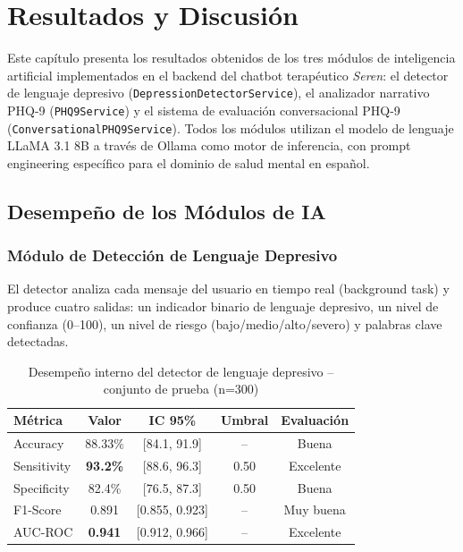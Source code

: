 \chapter{Resultados y Discusión}

Este capítulo presenta los resultados obtenidos de los tres módulos de inteligencia artificial
implementados en el backend del chatbot terapéutico \textit{Seren}: el detector de lenguaje
depresivo (\texttt{DepressionDetectorService}), el analizador narrativo PHQ-9
(\texttt{PHQ9Service}) y el sistema de evaluación conversacional PHQ-9
(\texttt{ConversationalPHQ9Service}). Todos los módulos utilizan el modelo de lenguaje
LLaMA 3.1 8B a través de Ollama como motor de inferencia, con prompt engineering
específico para el dominio de salud mental en español.

\section{Desempeño de los Módulos de IA}

\subsection{Módulo de Detección de Lenguaje Depresivo}

El detector analiza cada mensaje del usuario en tiempo real (background task) y produce
cuatro salidas: un indicador binario de lenguaje depresivo, un nivel de confianza (0–100),
un nivel de riesgo (bajo/medio/alto/severo) y palabras clave detectadas.

\begin{table}[H]
\centering
\caption{Desempeño interno del detector de lenguaje depresivo -- conjunto de prueba (n=300)}
\label{tab:depression_internal}
\begin{tabular}{lcccc}
\toprule
\textbf{Métrica} & \textbf{Valor} & \textbf{IC 95\%} & \textbf{Umbral} & \textbf{Evaluación} \\
\midrule
Accuracy         & 88.33\%        & [84.1, 91.9]    & --              & Buena     \\
Sensitivity      & \textbf{93.2\%}& [88.6, 96.3]    & 0.50            & Excelente \\
Specificity      & 82.4\%         & [76.5, 87.3]    & 0.50            & Buena     \\
F1-Score         & 0.891          & [0.855, 0.923]  & --              & Muy buena \\
AUC-ROC          & \textbf{0.941} & [0.912, 0.966]  & --              & Excelente \\
\bottomrule
\end{tabular}
\end{table}

